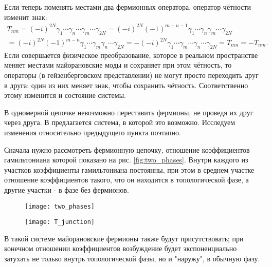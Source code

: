 \documentclass[a4paper,12pt]{article}
\theoremstyle{plain} %
\theoremstyle{definition} %
\theoremstyle{remark} %
\begin{document}
Если теперь поменять местами два фермионных оператора, оператор чётности изменит знак:
\begin{multline}
T_{nm} = (-i)^{2N} \gamma_1 \dotsm \gamma_n \dotsm \gamma_m \dotsm \gamma_{2N} = 
    (-i)^{2N} (-1)^{m-n-1} \gamma_1 \dotsm \gamma_n \gamma_m \dotsm \gamma_{2N} \\ =
    (-i)^{2N} (-1)^{m-n} \gamma_1 \dotsm \gamma_m \gamma_n \dotsm \gamma_{2N} = 
     - (-i)^{2N} \gamma_1 \dotsm \gamma_m \dotsm \gamma_n \dotsm \gamma_{2N} = 
     T_{mn} = - T_{nm}.
\end{multline}
Если совершается физическое преобразование, которое в реальном пространстве меняет местами майорановские моды и сохраняет при этом чётность, то операторы (в гейзенберговском представлении) не могут просто переходить друг в друга: один из них меняет знак, чтобы сохранить чётность. Соответственно этому изменится и состояние системы.

В одномерной цепочке невозможно переставить фермионы, не проведя их друг через друга. В \cite{braiding} предлагается система, в которой это возможно. Исследуем изменения относительно предыдущего пункта поэтапно.

Сначала нужно рассмотреть фермионную цепочку, отношение коэффициентов гамильтониана которой показано на рис. \ref{fig:two_phases}. Внутри каждого из участков коэффициенты гамильтониана постоянны, при этом в среднем участке отношение коэффициентов такого, что он находится в топологической фазе, а другие участки - в фазе без фермионов.

\begin{figure}
    \centering
    \begin{minipage}{.5\textwidth}
        \centering
        \texttt{[image: two\_phases]}
        \captionsetup{width=0.9\textwidth}
        \label{fig:two_phases}
    \end{minipage}%
    \begin{minipage}{.5\textwidth}
        \centering
        \texttt{[image: T\_junction]}
        \captionsetup{width=0.9\textwidth}
        \label{fig:t_junction}
    \end{minipage}
\end{figure}

В такой системе майорановские фермионы также будут присутствовать; при конечном отношении коэффициентов возбуждение будет экспоненциально затухать не только внутрь топологической фазы, но и "наружу"$ $, в обычную фазу.
\end{document}

